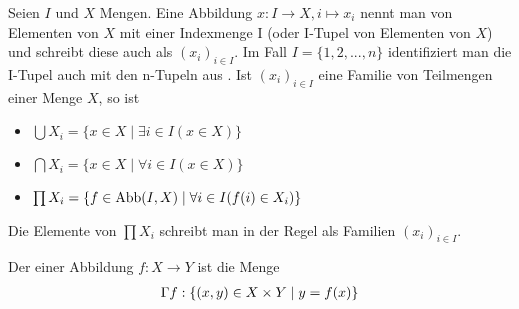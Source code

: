 \begin{definition}[Familie]
	Seien $I$ und $X$ Mengen. Eine Abbildung $x: I \to X, i \mapsto
	x_i$ nennt man  von Elementen von $X$ mit einer Indexmenge I (oder I-Tupel von 
	Elementen von $X$) und schreibt diese auch als $(x_i)_{i \in I}$. Im Fall $I=\{1,2,...,n\}$
	identifiziert man die I-Tupel auch mit den n-Tupeln aus . Ist $(x_i)_{i \in I}$ eine Familie von
	Teilmengen einer Menge $X$, so ist 
	\begin{itemize}
		\item $\bigcup X_i = \{x \in X \mid \exists i \in I(x \in X)\}$
		\item $\bigcap X_i = \{x \in X \mid \forall i \in I(x \in X)\}$
		\item $\prod X_i = \{f \in \operatorname{Abb}(I,X) \mid \forall i \in I(f(i) \in X_i)\}$
	\end{itemize}
	Die Elemente von $\prod X_i$ schreibt man in der Regel als Familien $(x_i)_{i \in I}$.
\end{definition}

\begin{definition}[Graph]
	Der  einer Abbildung $f: X \to Y$ ist die Menge
	\begin{align}
		\Gamma f: \{(x,y) \in X \times Y \mid y=f(x)\}\notag
	\end{align}
\end{definition}
